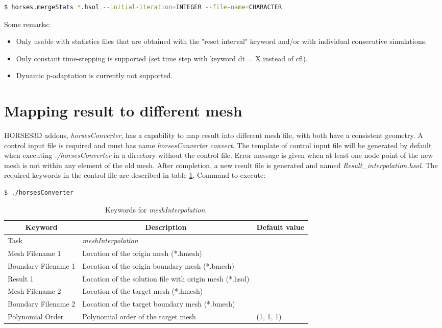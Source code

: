\documentclass[a4paper,10pt]{report}
\begin{document}
\begin{lstlisting}[language=bash]
	$ horses.mergeStats *.hsol --initial-iteration=INTEGER --file-name=CHARACTER
\end{lstlisting}

Some remarks:
\begin{itemize}
\item Only usable with statistics files that are obtained with the "reset interval" keyword and/or with individual consecutive simulations. 
\item Only constant time-stepping is supported (set time step with keyword dt = X instead of cfl).
\item Dynamic p-adaptation is currently not supported.
\end{itemize}

\section{Mapping result to different mesh} \label{tab:meshInterpolation}
HORSES3D addons, \textit{horsesConverter}, has a capability to map result into different mesh file, with both have a consistent geometry.  A control input file is required and must has name \textit{horsesConverter.convert}. The template of control input file will be generated by default when executing \textit{./horsesConverter} in a directory without the control file. Error message is given when at least one node point of the new mesh is not within any element of the old mesh. After completion, a new result file is generated and named \textit{Result\_interpolation.hsol}. The required keywords in the control file are described in table \ref{tab:mappingresult}. Command to execute:

\begin{lstlisting}[language=bash]
	$ ./horsesConverter
\end{lstlisting}

\begin{longtable}{|p{4cm}|p{10cm}|p{2.2cm}|}
\caption{Keywords for \textit{meshInterpolation}.} \label{tab:mappingresult} \\
\hline
\multicolumn{1}{|c|}{\textbf{Keyword}} & \multicolumn{1}{c|}{\textbf{Description}} & \multicolumn{1}{c|}{\textbf{Default value}} \\ \hline
\endfirsthead

Task 	        		& \textit{meshInterpolation} 						&  \\ \hline
Mesh Filename 1 		& Location of the origin mesh (*.hmesh) 	&  \\ \hline
Boundary Filename 1 	& Location of the origin boundary mesh (*.bmesh) 	&  \\ \hline
Result 1 			& Location of the solution file with origin mesh (*.hsol) 	&  \\ \hline
Mesh Filename 2 		& Location of the target mesh (*.hmesh) 	&  \\ \hline
Boundary Filename 2 	& Location of the target boundary mesh (*.bmesh) 	&  \\ \hline
Polynomial Order 	& Polynomial order of the target mesh 	& (1, 1, 1) \\ \hline
\end{longtable}
\end{document}
